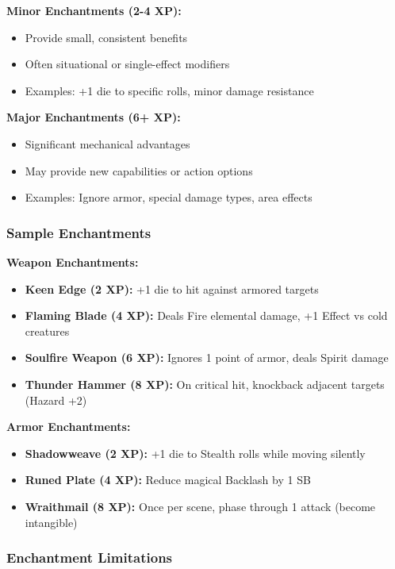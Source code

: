 \textbf{Minor Enchantments (2-4 XP):}
\begin{itemize}
\item Provide small, consistent benefits
\item Often situational or single-effect modifiers
\item Examples: +1 die to specific rolls, minor damage resistance
\end{itemize}

\textbf{Major Enchantments (6+ XP):}
\begin{itemize}
\item Significant mechanical advantages
\item May provide new capabilities or action options
\item Examples: Ignore armor, special damage types, area effects
\end{itemize}

\subsubsection{Sample Enchantments}

\textbf{Weapon Enchantments:}
\begin{itemize}
\item \textbf{Keen Edge (2 XP):} +1 die to hit against armored targets
\item \textbf{Flaming Blade (4 XP):} Deals Fire elemental damage, +1 Effect vs cold creatures
\item \textbf{Soulfire Weapon (6 XP):} Ignores 1 point of armor, deals Spirit damage
\item \textbf{Thunder Hammer (8 XP):} On critical hit, knockback adjacent targets (Hazard +2)
\end{itemize}

\textbf{Armor Enchantments:}
\begin{itemize}
\item \textbf{Shadowweave (2 XP):} +1 die to Stealth rolls while moving silently
\item \textbf{Runed Plate (4 XP):} Reduce magical Backlash by 1 SB
\item \textbf{Wraithmail (8 XP):} Once per scene, phase through 1 attack (become intangible)
\end{itemize}

\subsubsection{Enchantment Limitations}

